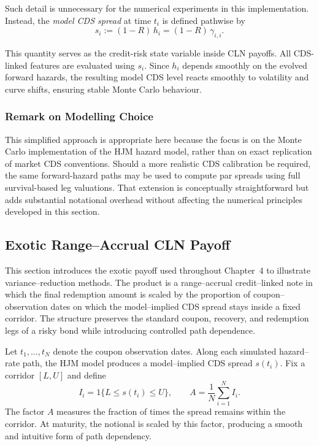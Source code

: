 Such detail is unnecessary for the numerical experiments in this
implementation. Instead, the \emph{model CDS spread} at time $t_i$ is defined
pathwise by
\[
s_i := (1 - R)\,h_i = (1 - R)\,\gamma_{i,i}.
\]

This quantity serves as the credit-risk state variable inside CLN
payoffs. All CDS-linked features are evaluated using
$s_i$. Since $h_i$ depends smoothly on the evolved forward hazards, the
resulting model CDS level reacts smoothly to volatility and curve
shifts, ensuring stable Monte Carlo behaviour.

\subsubsection*{Remark on Modelling Choice}

This simplified approach is appropriate here because the focus is on the
Monte Carlo implementation of the HJM hazard model,
rather than on exact replication of market CDS conventions. Should a
more realistic CDS calibration be required, the same forward-hazard
paths may be used to compute par spreads using full survival-based
leg valuations. That extension is conceptually straightforward but adds
substantial notational overhead without affecting the numerical
principles developed in this section.


\subsection{Exotic Range--Accrual CLN Payoff}

This section introduces the exotic payoff used throughout Chapter~4 to illustrate
variance--reduction methods. The product is a range--accrual credit--linked note
in which the final redemption amount is scaled by the proportion of
coupon--observation dates on which the model--implied CDS spread stays inside a
fixed corridor. The structure preserves the standard coupon, recovery, and
redemption legs of a risky bond while introducing controlled path dependence.

Let $t_1,\dots,t_N$ denote the coupon observation dates. Along each simulated
hazard--rate path, the HJM model produces a model--implied CDS spread $s(t_i)$.
Fix a corridor $[L,U]$ and define
\[
I_i = 1\{L \le s(t_i) \le U\},
\qquad
A = \frac{1}{N}\sum_{i=1}^N I_i.
\]
The factor $A$ measures the fraction of times the spread remains within the
corridor. At maturity, the notional is scaled by this factor, producing a smooth
and intuitive form of path dependency.

